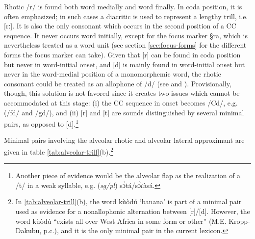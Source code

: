 Rhotic /r/ is found both word medially and word finally. In coda position, it is
often emphasized; in such cases a diacritic is used to represent a lengthy
trill, i.e. [rː]. It is also  the only consonant which occurs in the second
position of a CC sequence. It never occurs word initially, except for the focus
marker {\S ra}, which is nevertheless treated as a word unit (see section
\ref{sec:focus-forms} for the different forms the focus marker can take).  Given
that [r]  can be found in coda position but never in word-initial onset,  and
[d] is mainly found in word-initial onset but never in the word-medial position
of a monomorphemic word, the rhotic consonant could be treated as an allophone
of /d/ (see   \citet[30-31]{Awed02} and \citet[62-64]{Daku02a}). Provisionally,
though,  this solution is not favored since it creates two issues which cannot
 be accommodated at this stage: (i) the  CC sequence in onset becomes /Cd/,
e.g. (/fd/ and /gd/),  and (ii)  [r] and [t]   are sounds distinguished by
several
minimal pairs, as opposed to [d].\footnote{Another piece of evidence would be
the
alveolar flap as the realization of
a /t/ in a weak syllable, e.g.  ({\it sg/pl})
{\F sɔ̀tá}/{\F sɔ̀ɾàsá}.}

Minimal pairs
involving the alveolar rhotic and alveolar lateral approximant are given in
table \ref{tab:alveolar-trill}(b).\footnote{In \ref{tab:alveolar-trill}(b),
 the word {\F kùòdú} `banana' is part of a minimal pair used as evidence for
a  nonallophonic alternation between [r]/[d]. However, the word {\F
kùòdú} ``exists all over West Africa in some form or other''  (M.E.
Kropp-Dakubu, p.c.), and it is the only minimal pair in the current lexicon.}





